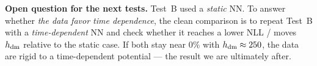 \documentclass[11pt]{article}
\newcommand{\hdm}{h_{\rm dm}}
\begin{document}
\textbf{Open question for the next tests.} Test~B used a \emph{static} NN. To
answer whether \emph{the data favor time dependence}, the clean comparison is to
repeat Test~B with a \emph{time-dependent} NN and check whether it reaches a lower
NLL / moves $\hdm$ relative to the static case. If both stay near $0\%$ with
$\hdm\approx250$, the data are rigid to a time-dependent potential --- the result
we are ultimately after.
\end{document}
